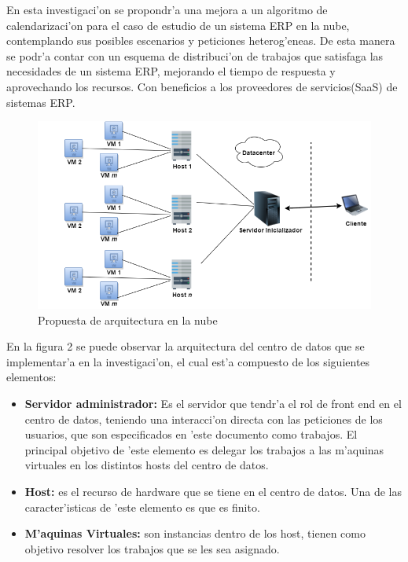 En esta investigaci'on se propondr'a una mejora a un algoritmo de calendarizaci'on para el caso de estudio de un sistema ERP en la nube, contemplando sus posibles escenarios y peticiones heterog'eneas. De esta manera se podr'a contar con un esquema de distribuci'on de trabajos que satisfaga las necesidades de un sistema ERP, mejorando el tiempo de respuesta y aprovechando los recursos. Con beneficios a los proveedores de servicios(SaaS) de sistemas ERP.

\begin{figure}
	
	\centering
	\includegraphics[scale=0.5]{media/cloud2}
	\caption{Propuesta de arquitectura en la nube}
\end{figure}


En la figura 2 se puede observar la arquitectura del centro de datos que se implementar'a en la investigaci'on, el cual est'a compuesto de los siguientes elementos:

\begin{itemize}
\item \textbf{Servidor administrador:} Es el servidor que tendr'a el rol de front end en el centro de datos, teniendo una interacci'on directa con las peticiones de los usuarios, que son especificados en 'este documento como trabajos.
El principal objetivo de 'este elemento es delegar los trabajos a las m'aquinas virtuales en los distintos hosts del centro de datos.
\item \textbf{Host:} es el recurso de hardware que se tiene en el centro de datos. Una de las caracter'isticas de 'este elemento es que es finito.
\item \textbf{M'aquinas Virtuales:} son instancias dentro de los host, tienen como objetivo resolver los trabajos que se les sea asignado.


\end{itemize}